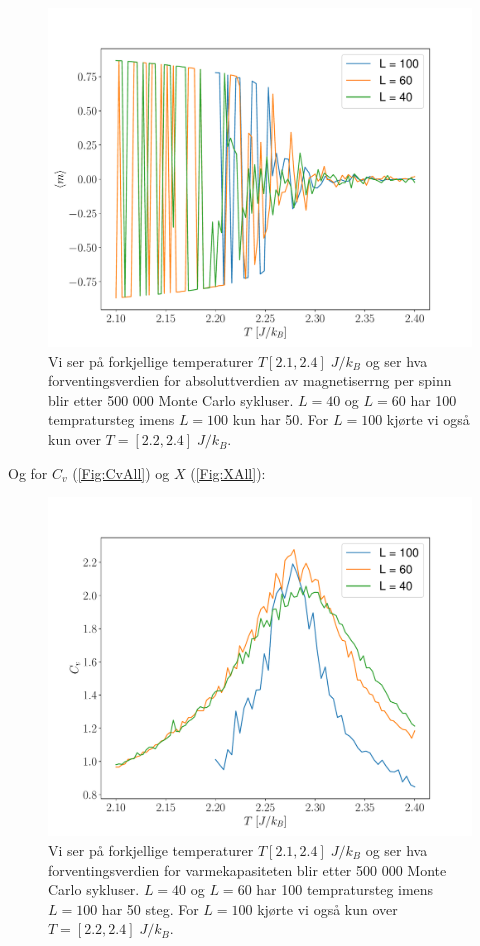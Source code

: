 \documentclass[reprint,english,notitlepage]{revtex4-2}  %
\begin{document}
\begin{figure}[H]
\centering
\includegraphics[scale=0.4, trim=2.5cm 0 0 0 ]{../Images/mPerTAll.pdf}
\caption{Vi ser på forkjellige temperaturer $T [2.1, 2.4] \; J/k_B$ og ser hva forventingsverdien for absoluttverdien av magnetiserrng per spinn blir etter 500 000 Monte Carlo sykluser. $L = 40$ og $L = 60$ har 100 tempratursteg imens $L = 100$ kun har 50. For $L = 100$ kjørte vi også kun over $ T = [2.2, 2.4] \; J/k_B$.}
\label{Fig:mAll}
\end{figure}

Og for $C_v$ (\autoref{Fig:CvAll}) og $X$ (\autoref{Fig:XAll}):


\begin{figure}[H]
\centering
\includegraphics[scale=0.4, trim=2.5cm 0 0 0 ]{../Images/CvPerTAll.pdf}
\caption{Vi ser på forkjellige temperaturer $T [2.1, 2.4] \; J/k_B$ og ser hva forventingsverdien for varmekapasiteten blir etter 500 000 Monte Carlo sykluser. $L = 40$ og $L = 60$ har 100 tempratursteg imens $L = 100$ har 50 steg. For $L = 100$ kjørte vi også kun over $ T = [2.2, 2.4] \; J/k_B$.}
\label{Fig:CvAll}
\end{figure}
\end{document}
